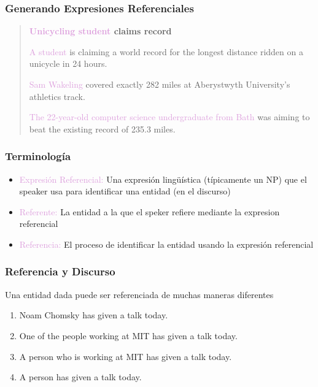 \documentclass[compress,color=usenames]{beamer}
\newcommand{\mH}[1]{\textcolor{Plum}{#1}}
\begin{document}
\begin{frame}
\frametitle{Generando Expresiones Referenciales}

\begin{quote}
\textbf{\mH{Unicycling student} claims record}\medskip

\mH{A student} is claiming a world record for the longest distance ridden
on a unicycle in 24 hours.\medskip

\mH{Sam Wakeling} covered exactly 282 miles at Aberystwyth
University's athletics track.\medskip

\mH{The 22-year-old computer science undergraduate from Bath} was
aiming to beat the existing record of 235.3 miles.
\end{quote}

\end{frame}

\begin{frame}
\frametitle{Terminolog\'ia}

\begin{itemize}
\item \mH{Expresi\'on Referencial:}
Una expresi\'on ling\"u\'istica (t\'ipicamente un NP) que el speaker
usa para identificar una entidad (en el discurso)

\item \mH{Referente:}
La entidad a la que el speker refiere mediante la expresion referencial

\item \mH{Referencia:}
El proceso de identificar la entidad usando la expresi\'on referencial

\end{itemize}
\end{frame}


\begin{frame}
\frametitle{Referencia y Discurso}

Una entidad dada puede ser referenciada de muchas maneras diferentes

\begin{enumerate}
\item 
Noam Chomsky has given a talk today.

\item
One of the people working at MIT has given a talk today.

\item 
A person who is working at MIT has given a talk today.

\item 
A person has given a talk today.
\end{enumerate}
\end{frame}
\end{document}
